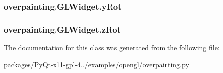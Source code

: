 \subsubsection[{y\+Rot}]{\setlength{\rightskip}{0pt plus 5cm}overpainting.\+G\+L\+Widget.\+y\+Rot}\label{classoverpainting_1_1GLWidget_ac0767cdb4479fd11bba6d0c472804b1f}
\hypertarget{classoverpainting_1_1GLWidget_a58991bd3c555a416f3e4e3c14bce33ea}{}
\subsubsection[{z\+Rot}]{\setlength{\rightskip}{0pt plus 5cm}overpainting.\+G\+L\+Widget.\+z\+Rot}\label{classoverpainting_1_1GLWidget_a58991bd3c555a416f3e4e3c14bce33ea}


The documentation for this class was generated from the following file\+:\begin{DoxyCompactItemize}
\item 
packages/\+Py\+Qt-\/x11-\/gpl-\/4../examples/opengl/\hyperlink{overpainting_8py}{overpainting.\+py}\end{DoxyCompactItemize}
